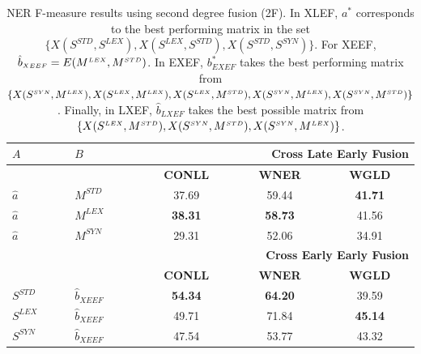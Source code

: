 \begin{table}[t]
\centering

\caption{NER F-measure results using second degree fusion (2F). In XLEF, ${a^*}$ corresponds to the best performing matrix in the set $\{ X(S^{\scriptscriptstyle STD}, S^{\scriptscriptstyle LEX}),X(S^{\scriptscriptstyle LEX}, S^{\scriptscriptstyle STD}), \allowbreak X(S^{\scriptscriptstyle STD}, S^{\scriptscriptstyle SYN})\}$. For XEEF,  $\hat{b}_{\scriptscriptstyle XEEF}=E(M^{\scriptscriptstyle LEX}, M^{\scriptscriptstyle STD})$. In EXEF, $b^*_{\scriptscriptstyle EXEF}$  takes the best performing matrix from $\{X(S^{\scriptscriptstyle SYN}, M^{\scriptscriptstyle LEX}), \allowbreak X(S^{\scriptscriptstyle LEX}, M^{\scriptscriptstyle LEX}), X(S^{\scriptscriptstyle LEX}, M^{\scriptscriptstyle STD}), \allowbreak X(S^{\scriptscriptstyle SYN}, M^{\scriptscriptstyle LEX}), X(S^{\scriptscriptstyle SYN}, M^{\scriptscriptstyle STD}) \}$. Finally, in LXEF, $\hat{b}_{\scriptscriptstyle LXEF}$ takes the best possible matrix from $\{X(S^{\scriptscriptstyle LEX}, M^{\scriptscriptstyle STD}), X(S^{\scriptscriptstyle SYN}, M^{\scriptscriptstyle STD}), \allowbreak X(S^{\scriptscriptstyle SYN}, M^{\scriptscriptstyle LEX}) \}$.}
\label{tab:ner_2d}
\begin{tabular}{@{}llccc@{}}
	\toprule
	$A$                      & $B$            & \multicolumn{3}{r}{\textbf{Cross Late Early Fusion}}  \\ \midrule
	                         &                & \textbf{CONLL} & \textbf{WNER}  &             \textbf{WGLD}             \\
	\cmidrule{3-5}
$\hat{a}$ & $M^{\scriptscriptstyle STD}$      & 37.69 & 59.44 &            \textbf{41.71}             \\
	$\hat{a}$                & $M^{\scriptscriptstyle LEX}$      & \textbf{38.31} & \textbf{58.73} &            41.56             \\
	$\hat{a}$                & $M^{\scriptscriptstyle SYN}$      & 29.31 & 52.06 &            34.91             \\ \midrule
	                         &                & \multicolumn{3}{r}{\textbf{Cross Early Early Fusion}} \\ \midrule
	                         &                & \textbf{CONLL} & \textbf{WNER}  &             \textbf{WGLD}             \\
	\cmidrule{3-5}
$S^{\scriptscriptstyle STD}$ & $\hat{b}_{\scriptscriptstyle XEEF}$          &   \textbf{54.34}    &    \textbf{64.20}   & 39.59 \\
	$S^{\scriptscriptstyle LEX}$                &$\hat{b}_{\scriptscriptstyle XEEF}$         &  49.71     &   71.84    &  \textbf{45.14}\\
	$S^{\scriptscriptstyle SYN}$                & $\hat{b}_{\scriptscriptstyle XEEF}$         &  47.54     &   53.77    & 43.32 \\ \midrule

\end{tabular}
\end{table}
